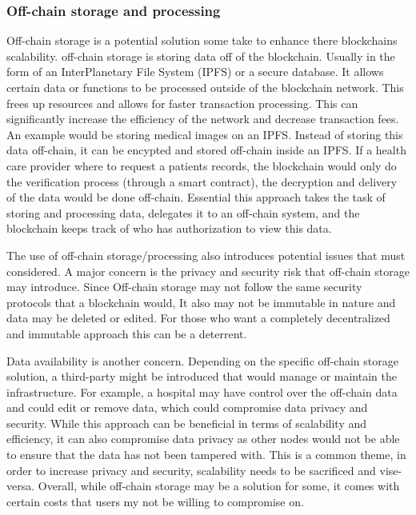 \documentclass{article}
\begin{document}
\subsubsection{Off-chain storage and processing}
Off-chain storage is a potential solution some take to enhance there blockchains scalability. off-chain storage is storing data off of the blockchain. Usually in the form of an InterPlanetary File System (IPFS) or a secure database. It allows certain data or functions to be processed outside of the blockchain network. This frees up resources and allows for faster transaction processing. This can significantly increase the efficiency of the network and decrease transaction fees. An example would be storing medical images on an IPFS. Instead of storing this data off-chain, it can be encypted and stored off-chain inside an IPFS. If a health care provider where to request a patients records, the blockchain would only do the verification process (through a smart contract), the decryption and delivery of the data would be done off-chain. Essential this approach takes the task of storing and processing data, delegates it to an off-chain system, and the blockchain keeps track of who has authorization to view this data. 

The use of off-chain storage/processing also introduces potential issues that must considered. A major concern is the privacy and security risk that off-chain storage may introduce. Since Off-chain storage may not follow the same security protocols that a blockchain would, It also may not be immutable in nature and data may be deleted or edited. For those who want a completely decentralized and immutable approach this can be a deterrent. 

Data availability is another concern. Depending on the specific off-chain storage solution, a third-party might be introduced that would manage or maintain the infrastructure. For example, a hospital may have control over the off-chain data and could edit or remove data, which could compromise data privacy and security. While this approach can be beneficial in terms of scalability and efficiency, it can also compromise data privacy as other nodes would not be able to ensure that the data has not been tampered with. This is a common theme, in order to increase privacy and security, scalability needs to be sacrificed and vise-versa. Overall, while off-chain storage may be a solution for some, it comes with certain costs that users my not be willing to compromise on.
\end{document}
